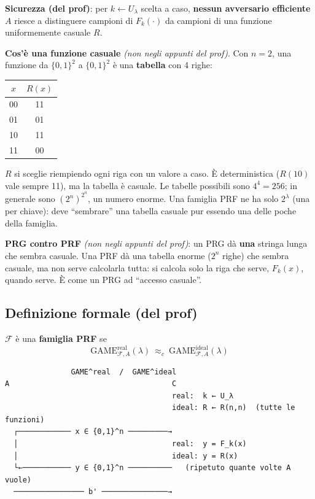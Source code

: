 \textbf{Sicurezza (del prof)}: per \(k \leftarrow U_\lambda\) scelta a caso, \textbf{nessun avversario efficiente} \(A\) riesce a distinguere campioni di \(F_k(\cdot)\) da campioni di una funzione uniformemente casuale \(R\).

\begin{esempio}
\textbf{Cos'è una funzione casuale} \emph{(non negli appunti del prof)}. Con \(n = 2\), una funzione da \(\{0,1\}^2\) a \(\{0,1\}^2\) è una \textbf{tabella} con 4 righe:

\begin{center}
\begin{tabular}{cc}
\toprule
\(x\) & \(R(x)\) \\
\midrule
00 & 11 \\
01 & 01 \\
10 & 11 \\
11 & 00 \\
\bottomrule
\end{tabular}
\end{center}

\(R\) si sceglie riempiendo ogni riga con un valore a caso. È deterministica (\(R(10)\) vale sempre 11), ma la tabella è casuale. Le tabelle possibili sono \(4^4 = 256\); in generale sono \((2^n)^{2^n}\), un numero enorme. Una famiglia PRF ne ha solo \(2^\lambda\) (una per chiave): deve ``sembrare'' una tabella casuale pur essendo una delle poche della famiglia.
\end{esempio}

\begin{nota}
\textbf{PRG contro PRF} \emph{(non negli appunti del prof)}: un PRG dà \textbf{una} stringa lunga che sembra casuale. Una PRF dà una tabella enorme (\(2^n\) righe) che sembra casuale, ma non serve calcolarla tutta: si calcola solo la riga che serve, \(F_k(x)\), quando serve. È come un PRG ad ``accesso casuale''.
\end{nota}

\subsection{Definizione formale (del prof)}

\(\mathcal{F}\) è una \textbf{famiglia PRF} se
\[
\text{GAME}^{\text{real}}_{\mathcal{F}, A}(\lambda) \ \approx_c\ \text{GAME}^{\text{ideal}}_{\mathcal{F}, A}(\lambda)
\]

\begin{verbatim}
               GAME^real  /  GAME^ideal
A                                     C
                                      real:  k ← U_λ
                                      ideal: R ← R(n,n)  (tutte le funzioni)
  ┌──────────── x ∈ {0,1}^n ─────────→
  │                                   real:  y = F_k(x)
  │                                   ideal: y = R(x)
  └←─────────── y ∈ {0,1}^n ──────────   (ripetuto quante volte A vuole)
  ──────────────── b' ───────────────→
\end{verbatim}

